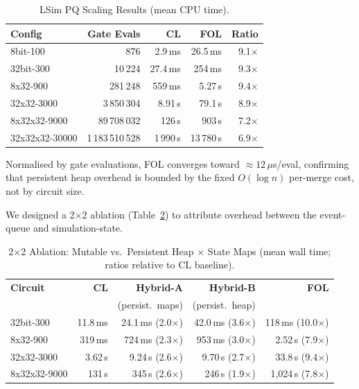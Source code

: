 \documentclass[sigconf,nonacm]{acmart}
\begin{document}
\begin{table}[htbp]
\small
\caption{LSim PQ Scaling Results (mean CPU time).}
\label{tab:lsim-perf}
\begin{tabular}{lrrrr}
\toprule
\textbf{Config} & \textbf{Gate Evals} & \textbf{CL} & \textbf{FOL} & \textbf{Ratio} \\
\midrule
8bit-100        &           876 &   2.9\,ms &  26.5\,ms & 9.1$\times$ \\
32bit-300       &        10\,224 &  27.4\,ms &   254\,ms & 9.3$\times$ \\
8x32-900        &       281\,248 &   559\,ms &   5.27\,s & 9.4$\times$ \\
32x32-3000      &     3\,850\,304 &   8.91\,s &  79.1\,s  & 8.9$\times$ \\
8x32x32-9000    &    89\,708\,032 &   126\,s  &   903\,s  & 7.2$\times$ \\
32x32x32-30000  & 1\,183\,510\,528 & 1\,990\,s & 13\,780\,s & 6.9$\times$ \\
\bottomrule
\end{tabular}
\end{table}

Normalised by gate evaluations, FOL converges toward ${\approx}12\,\mu$s/eval, confirming that persistent heap overhead is bounded by the fixed $O(\log n)$ per-merge cost, not by circuit size.

We designed a 2$\times$2 ablation (Table~\ref{tab:lsim-ablation}) to attribute overhead between the event-queue and simulation-state. 

\begin{table}[htbp]
\small
\caption{2$\times$2 Ablation: Mutable vs.\ Persistent Heap $\times$ State Maps (mean wall time; ratios relative to CL baseline).}
\label{tab:lsim-ablation}
\begin{tabular}{lrrrr}
\toprule
\textbf{Circuit} & \textbf{CL} & \textbf{Hybrid-A} & \textbf{Hybrid-B} & \textbf{FOL} \\
                 &             & \footnotesize (persist.\ maps) & \footnotesize (persist.\ heap) & \\
\midrule
32bit-300    & 11.8\,ms & 24.1\,ms (2.0$\times$) & 42.0\,ms (3.6$\times$) & 118\,ms (10.0$\times$) \\
8x32-900     & 319\,ms  & 724\,ms  (2.3$\times$) & 953\,ms  (3.0$\times$) & 2.52\,s (7.9$\times$) \\
32x32-3000   & 3.62\,s  & 9.24\,s  (2.6$\times$) & 9.70\,s  (2.7$\times$) & 33.8\,s (9.4$\times$) \\
8x32x32-9000 & 131\,s   & 345\,s   (2.6$\times$) & 246\,s   (1.9$\times$) & 1{,}024\,s (7.8$\times$) \\
\bottomrule
\end{tabular}
\end{table}
\end{document}
